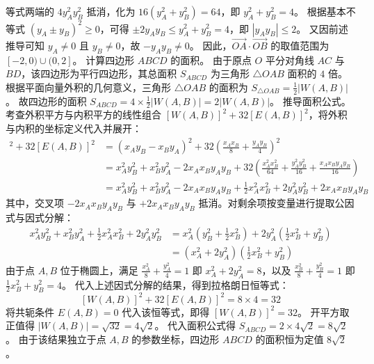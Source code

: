 \begin{solution}
等式两端的 $4y_A^2 y_B^2$ 抵消，化为 $16(y_A^2 + y_B^2) = 64$，即 $y_A^2 + y_B^2 = 4$。
根据基本不等式 $(y_A \pm y_B)^2 \ge 0$，可得 $\pm 2y_A y_B \le y_A^2 + y_B^2 = 4$，即 $|y_A y_B| \le 2$。
又因前述推导可知 $y_A \neq 0$ 且 $y_B \neq 0$，故 $-y_A y_B \neq 0$。
因此，$\overrightarrow{OA} \cdot \overrightarrow{OB}$ 的取值范围为 $[-2, 0) \cup (0, 2]$。
计算四边形 $ABCD$ 的面积。
由于原点 $O$ 平分对角线 $AC$ 与 $BD$，该四边形为平行四边形，其总面积 $S_{ABCD}$ 为三角形 $\triangle OAB$ 面积的 $4$ 倍。
根据平面向量外积的几何意义，三角形 $\triangle OAB$ 的面积为 $S_{\triangle OAB} = \frac{1}{2} |W(A, B)|$。
故四边形的面积 $S_{ABCD} = 4 \times \frac{1}{2} |W(A, B)| = 2 |W(A, B)|$。
推导面积公式。考查外积平方与内积平方的线性组合 $[W(A, B)]^2 + 32[E(A, B)]^2$，将外积与内积的坐标定义代入并展开：
\begin{align*}
[W(A, B)]^2 + 32[E(A, B)]^2 &= (x_A y_B - x_B y_A)^2 + 32 \left( \frac{x_A x_B}{8} + \frac{y_A y_B}{4} \right)^2 \\
&= x_A^2 y_B^2 + x_B^2 y_A^2 - 2x_A x_B y_A y_B + 32 \left( \frac{x_A^2 x_B^2}{64} + \frac{y_A^2 y_B^2}{16} + \frac{x_A x_B y_A y_B}{16} \right) \\
&= x_A^2 y_B^2 + x_B^2 y_A^2 - 2x_A x_B y_A y_B + \frac{1}{2} x_A^2 x_B^2 + 2y_A^2 y_B^2 + 2x_A x_B y_A y_B
\end{align*}
其中，交叉项 $-2x_A x_B y_A y_B$ 与 $+2x_A x_B y_A y_B$ 抵消。对剩余项按变量进行提取公因式与因式分解：
\begin{align*}
x_A^2 y_B^2 + x_B^2 y_A^2 + \frac{1}{2} x_A^2 x_B^2 + 2y_A^2 y_B^2 &= x_A^2 \left( y_B^2 + \frac{1}{2} x_B^2 \right) + 2y_A^2 \left( \frac{1}{2} x_B^2 + y_B^2 \right) \\
&= (x_A^2 + 2y_A^2) \left( \frac{1}{2} x_B^2 + y_B^2 \right)
\end{align*}
由于点 $A, B$ 位于椭圆上，满足 $\frac{x_A^2}{8} + \frac{y_A^2}{4} = 1$ 即 $x_A^2 + 2y_A^2 = 8$，以及 $\frac{x_B^2}{8} + \frac{y_B^2}{4} = 1$ 即 $\frac{1}{2}x_B^2 + y_B^2 = 4$。
代入上述因式分解的结果，得到拉格朗日恒等式：
\[ [W(A, B)]^2 + 32[E(A, B)]^2 = 8 \times 4 = 32 \]
将共轭条件 $E(A, B) = 0$ 代入该恒等式，即得 $[W(A, B)]^2 = 32$。
开平方取正值得 $|W(A, B)| = \sqrt{32} = 4\sqrt{2}$。
代入面积公式得 $S_{ABCD} = 2 \times 4\sqrt{2} = 8\sqrt{2}$。
由于该结果独立于点 $A, B$ 的参数坐标，四边形 $ABCD$ 的面积恒为定值 $8\sqrt{2}$。
\end{solution}



